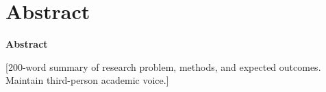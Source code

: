 \section*{Abstract}
\begin{center}
    \textbf{Abstract}
\end{center}
[200-word summary of research problem, methods, and expected outcomes. Maintain third-person academic voice.]
